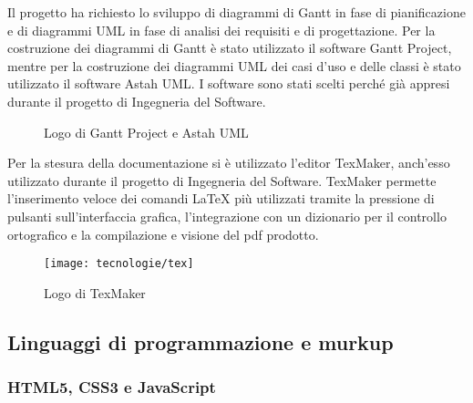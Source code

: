 Il progetto ha richiesto lo sviluppo di diagrammi di Gantt in fase di pianificazione e di diagrammi UML in fase di analisi dei requisiti e di progettazione. Per la costruzione dei diagrammi di Gantt è stato utilizzato il software Gantt Project, mentre per la costruzione dei diagrammi UML dei casi d'uso e delle classi è stato utilizzato il software Astah UML. I software sono stati scelti perché già appresi durante il progetto di Ingegneria del Software.

\begin{figure}[!h] 
    \centering 
    \caption{Logo di Gantt Project e Astah UML}
\end{figure}

Per la stesura della documentazione si è utilizzato l'editor TexMaker, anch'esso utilizzato durante il progetto di Ingegneria del Software. TexMaker permette l'inserimento veloce dei comandi \LaTeX{} più utilizzati tramite la pressione di pulsanti sull'interfaccia grafica, l'integrazione con un dizionario per il controllo ortografico e la compilazione e visione del pdf prodotto.

\begin{figure}[!h] 
    \centering 
    \texttt{[image: tecnologie/tex]} 
    \caption{Logo di TexMaker}
\end{figure}

\subsection{Linguaggi di programmazione e murkup}

\subsubsection{HTML5, CSS3 e JavaScript}

